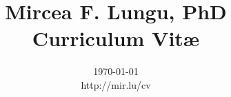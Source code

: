 \documentclass[a4paper]{article}
\begin{document}
\title{\textsf{Mircea F. Lungu, PhD \\Curriculum Vit\ae}}
\author{}

\pagestyle{myheadings}
\pagestyle{fancy}

\thispagestyle{plain}

\renewcommand{\headrulewidth}{0.0pt}
\renewcommand{\footrulewidth}{0.0pt}


\posttitle{\par\end{center}\vspace{-1.0cm}}
\date{\today\\\small http://mir.lu/cv}
\maketitle

\thispagestyle{empty}






\newpage






\newpage











\newpage

\end{document}
